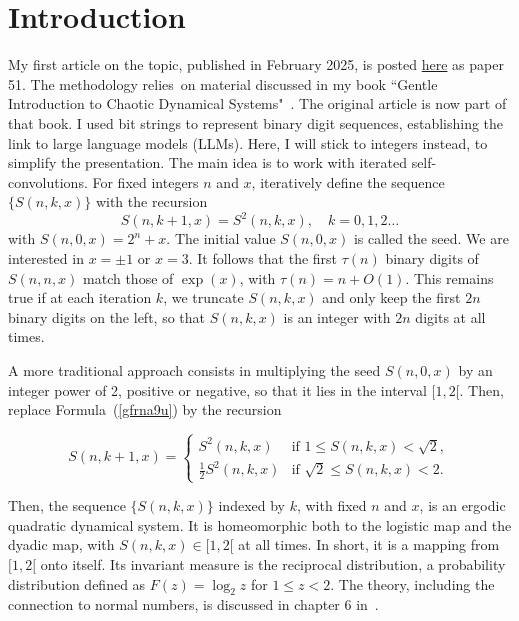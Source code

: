 \documentclass[10pt]{article}
\begin{document}
\section{Introduction}

My first article on the topic, published in February 2025, is posted  \href{https://mltblog.com/3zsnQ2g}{here} as paper 51.
The methodology relies~on material discussed  in my book ``Gentle Introduction to
Chaotic Dynamical Systems"~\cite{vgchaos}. The original article is now part of that book.  
I used bit strings to represent binary digit sequences, establishing the link to large language models (LLMs). Here, I will stick to integers instead, to simplify the presentation.
The main idea is to work with iterated \textcolor{index}{self-convolutions}. For fixed integers $n$ and $x$, iteratively  define the sequence $\{ S(n, k, x) \}$ with the recursion
\begin{equation}
S(n, k+1, x) = S^2(n, k, x), \quad k=0,1,2\dots  \label{gfrna9u}
\end{equation}
with  $S(n, 0, x) = 2^n + x$. The initial value $S(n, 0, x)$ is called the \textcolor{index}{seed}. 
We are interested in $x=\pm1$ or $x=3$. It follows that the first $\tau(n)$ binary digits of $S(n, n, x)$ match those of $\exp(x)$, with $\tau(n) = n +O(1)$. This remains true if at each iteration $k$, we \textcolor{index}{truncate} $S(n, k, x)$ and only keep the first $2n$ binary digits on the left, so that $S(n,k,x)$ is an integer with $2n$ digits at all times.

A more traditional approach consists in multiplying the seed $S(n, 0, x)$ by an integer power of 2, positive or negative, so that it lies in the interval $[1, 2[$. Then, replace Formula~(\ref{gfrna9u}) by the recursion

\begin{equation}
S(n, k+1, x) = \begin{cases}
\displaystyle  
S^2(n,k,x) & \text{if $1\leq S(n, k, x) < \sqrt{2}$},\\
\frac{1}{2} S^2(n, k, x)  & \text{if $\sqrt{2}\leq S(n, k, x) <2$}. \label{beurre4}
\end{cases}
\end{equation}

\noindent Then, the sequence $\{S(n,k,x) \}$ indexed by $k$, with fixed $n$ and $x$, is an \textcolor{index}{ergodic}  quadratic \textcolor{index}{dynamical system}. It is \textcolor{index}{homeomorphic} both to the \textcolor{index}{logistic map}  and the \textcolor{index}{dyadic map}, with $S(n,k,x)\in [1,2[$ at all times. In short, it is
 a mapping from $[1, 2[$ onto itself. Its \textcolor{index}{invariant measure} is the 
\textcolor{index}{reciprocal distribution}, a probability distribution defined as $F(z) = \log_2 z$ for $1\leq z < 2$.
The theory, including the connection to \textcolor{index}{normal numbers},  is discussed in chapter 6 in~\cite{vgchaos}. 
\end{document}
